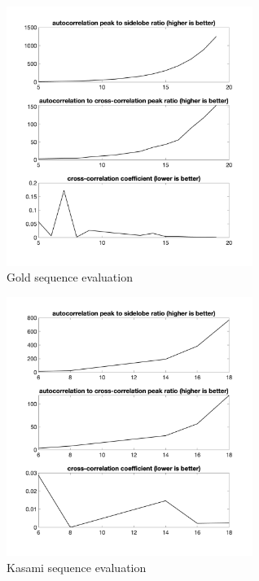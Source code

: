 \begin{figure}[h]
	\includegraphics[width=8cm]{images/matlabplots/gold}

	\caption{Gold sequence evaluation}
\end{figure}

\begin{figure}[h]
	\includegraphics[width=8cm]{images/matlabplots/kasami}

	\caption{Kasami sequence evaluation}
\end{figure}


